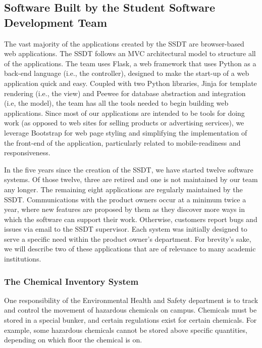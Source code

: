 
\subsection{Software Built by the Student Software Development Team}
The vast majority of the applications created by the SSDT are browser-based web applications. The SSDT follows an MVC architectural model to structure all of the applications. The team uses Flask, a web framework that uses Python as a back-end language (i.e., the controller), designed to make the start-up of a web application quick and easy. Coupled with two Python libraries, Jinja for template rendering (i.e., the view) and Peewee for database abstraction and integration (i.e, the model), the team has all the tools needed to begin building web applications. Since most of our applications are intended to be tools for doing work (as opposed to web sites for selling products or advertising services), we leverage Bootstrap for web page styling and simplifying the implementation of the front-end of the application, particularly related to mobile-readiness and responsiveness. 

In the five years since the creation of the SSDT, we have started twelve software systems. Of those twelve, three are retired and one is not maintained by our team any longer. The remaining eight applications are regularly maintained by the SSDT. Communications with the product owners occur at a minimum twice a year, where new features are proposed by them as they discover more ways in which the software can support their work. Otherwise, customers report bugs and issues via email to the SSDT supervisor. Each system was initially designed to serve a specific need within the product owner's department. For brevity's sake, we will describe two of these applications that are of relevance to many academic institutions.


\subsubsection{The Chemical Inventory System} %
One responsibility of the Environmental Health and Safety department is to track and control the movement of hazardous chemicals on campus. Chemicals must be stored in a special bunker, and certain regulations exist for certain chemicals. For example, some hazardous chemicals cannot be stored above specific quantities, depending on which floor the chemical is on. 

